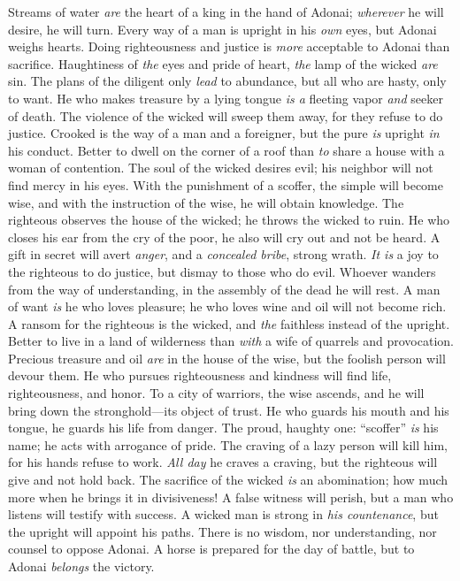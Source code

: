 \begin{biblechapter} %
\verse Streams of water \textit{are} the heart of a king in the hand of Adonai; 
\textit{wherever} he will desire, he will turn.
\verse Every way of a man is upright in his \textit{own} eyes, 
but Adonai weighs hearts.
\verse Doing righteousness and justice is \textit{more} acceptable 
to Adonai than sacrifice.
\verse Haughtiness of \textit{the} eyes and pride of heart, 
\textit{the} lamp of the wicked \textit{are} sin.
\verse The plans of the diligent only \textit{lead} to abundance, 
but all who are hasty, only to want.
\verse He who makes treasure by a lying tongue 
\textit{is a} fleeting vapor \textit{and} seeker of death.
\verse The violence of the wicked will sweep them away, 
for they refuse to do justice.
\verse Crooked is the way of a man and a foreigner, 
but the pure \textit{is} upright \textit{in} his conduct.
\verse Better to dwell on the corner of a roof 
than \textit{to} share a house with a woman of contention.
\verse The soul of the wicked desires evil; 
his neighbor will not find mercy in his eyes.
\verse With the punishment of a scoffer, the simple will become wise, 
and with the instruction of the wise, he will obtain knowledge.
\verse The righteous observes the house of the wicked; 
he throws the wicked to ruin.
\verse He who closes his ear from the cry of the poor, 
he also will cry out and not be heard.
\verse A gift in secret will avert \textit{anger}, 
and a \textit{concealed bribe}, strong wrath.
\verse \textit{It is} a joy to the righteous to do justice, 
but dismay to those who do evil.
\verse Whoever wanders from the way of understanding, 
in the assembly of the dead he will rest.
\verse A man of want \textit{is} he who loves pleasure; 
he who loves wine and oil will not become rich.
\verse A ransom for the righteous is the wicked, 
and \textit{the} faithless instead of the upright.
\verse Better to live in a land of wilderness 
than \textit{with} a wife of quarrels and provocation.
\verse Precious treasure and oil \textit{are} in the house of the wise, 
but the foolish person will devour them.
\verse He who pursues righteousness and kindness 
will find life, righteousness, and honor.
\verse To a city of warriors, the wise ascends, 
and he will bring down the stronghold—its object of trust.
\verse He who guards his mouth and his tongue, 
he guards his life from danger.
\verse The proud, haughty one: “scoffer” \textit{is} his name; 
he acts with arrogance of pride.
\verse The craving of a lazy person will kill him, 
for his hands refuse to work.
\verse \textit{All day} he craves a craving, 
but the righteous will give and not hold back.
\verse The sacrifice of the wicked \textit{is} an abomination; 
how much more when he brings it in divisiveness!
\verse A false witness will perish, 
but a man who listens will testify with success.
\verse A wicked man is strong in \textit{his countenance}, 
but the upright will appoint his paths.
\verse There is no wisdom, nor understanding, 
nor counsel to oppose Adonai.
\verse A horse is prepared for the day of battle, 
but to Adonai \textit{belongs} the victory.
\end{biblechapter}

